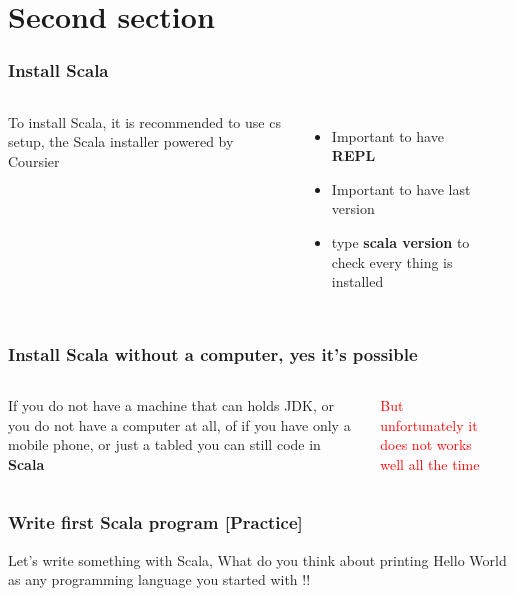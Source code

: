 \documentclass{beamer}
\begin{document}
\section{Second section}

\begin{frame}
\frametitle{Install Scala}

\begin{columns}

To install Scala, it is recommended to use cs setup, the Scala installer powered by Coursier

\begin{itemize}
  \item Important to have \textbf{REPL}
  \item Important to have last version
  \item type \textbf{scala version} to check every thing is installed
\end{itemize}

 \\
\end{columns}
\end{frame}


\begin{frame}
\frametitle{Install Scala without a computer, yes it's possible}

\begin{columns}

If you do not have a machine that can holds JDK, or you do not have a computer at all, of if you have only a mobile phone, or just a tabled you can still code in \textbf{Scala}

\textcolor{red}{But unfortunately it does not works well all the time}
 
 \\
\end{columns}
\end{frame}

\begin{frame}
\frametitle{Write first Scala program [Practice]}

 Let's write something with Scala, What do you think about printing Hello World as any programming language you started with !!
 
\end{frame}
\end{document}

